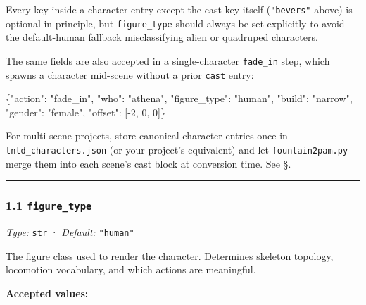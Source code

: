 \documentclass[
  11pt,
]{book}
\newenvironment{Shaded}{}{}
\newcommand{\DataTypeTok}[1]{\textcolor[rgb]{0.56,0.13,0.00}{#1}}
\newcommand{\DecValTok}[1]{\textcolor[rgb]{0.25,0.63,0.44}{#1}}
\newcommand{\FunctionTok}[1]{\textcolor[rgb]{0.02,0.16,0.49}{#1}}
\newcommand{\OtherTok}[1]{\textcolor[rgb]{0.00,0.44,0.13}{#1}}
\newcommand{\StringTok}[1]{\textcolor[rgb]{0.25,0.44,0.63}{#1}}
\begin{document}
Every key inside a character entry except the cast-key itself
(\texttt{"bevers"} above) is optional in principle, but
\texttt{figure\_type} should always be set explicitly to avoid the
default-human fallback misclassifying alien or quadruped characters.

The same fields are also accepted in a single-character
\texttt{fade\_in} step, which spawns a character mid-scene without a
prior \texttt{cast} entry:

\begin{Shaded}
\begin{Highlighting}[]
\FunctionTok{\{}\DataTypeTok{"action"}\FunctionTok{:} \StringTok{"fade\_in"}\FunctionTok{,} \DataTypeTok{"who"}\FunctionTok{:} \StringTok{"athena"}\FunctionTok{,}
 \DataTypeTok{"figure\_type"}\FunctionTok{:} \StringTok{"human"}\FunctionTok{,} \DataTypeTok{"build"}\FunctionTok{:} \StringTok{"narrow"}\FunctionTok{,} \DataTypeTok{"gender"}\FunctionTok{:} \StringTok{"female"}\FunctionTok{,}
 \DataTypeTok{"offset"}\FunctionTok{:} \OtherTok{[}\DecValTok{{-}2}\OtherTok{,} \DecValTok{0}\OtherTok{,} \DecValTok{0}\OtherTok{]}\FunctionTok{\}}
\end{Highlighting}
\end{Shaded}

For multi-scene projects, store canonical character entries once in
\texttt{tntd\_characters.json} (or your project's equivalent) and let
\texttt{fountain2pam.py} merge them into each scene's cast block at
conversion time. See
\S \cite{field-precedence-and-the-canonical-registry}.%

\begin{center}\rule{0.5\linewidth}{0.5pt}\end{center}

\subsubsection{\texorpdfstring{1.1
\texttt{figure\_type}}{1.1 figure\_type}}\label{figure_type}

\emph{Type:} \texttt{str} · \emph{Default:} \texttt{"human"}

The figure class used to render the character. Determines skeleton
topology, locomotion vocabulary, and which actions are meaningful.

\textbf{Accepted values:}
\end{document}
